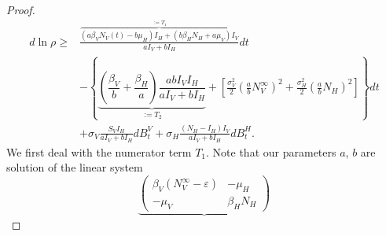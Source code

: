 \begin{proof}
\begin{equation}
        \begin{aligned}
            d \ln \rho
                \geq &
                \frac{
                    \overbrace{
                        \left(
                            a \beta_V N_V(t) - b \mu_H
                        \right) I_H
                        +
                        \left(
                            b \beta_H N_H + a \mu_V
                        \right) I_V
                    } ^ {:=T_1}
                }{a I_V + bI_H}
                dt
                \\
                &-
                \left \{
                    \underbrace{
                        \left(
                            \dfrac{\beta_V}{b}
                            +
                            \dfrac{\beta_H}{a}
                        \right)
                        \dfrac{
                            a b I_V I_H
                        }{
                            a I_V + b I_H
                        }
                    }_{:=T_2}
                    +
                    \left[
                        \frac{\sigma_V ^ 2}{2}
                        \left(
                            \frac{a}{b} N_V ^ \infty
                        \right) ^2
                        +
                        \frac{\sigma_H ^ 2}{2}
                        \left(
                            \frac{a}{b}
                            N_H
                        \right) ^ 2
                    \right]
                \right\}
                dt
                \\
                & +
                \sigma_V 
                \frac{S_V I_H}{a I_V + b I_H}
                d B_t ^ V
                +
                \sigma_H 
                \frac{(N_H - I_H) I_V}{a I_V + b I_H}
                d B_t ^ H .
        \end{aligned}
    \end{equation}
    We first deal with the numerator term $T_1$. Note that our parameters $a$, 
    $b$ are solution of the linear system
    \begin{equation*}
        \underbrace{
            \begin{pmatrix}
                \beta_V \left(N_V ^ {\infty} -\varepsilon\right)
                    & - \mu_H 
                \\
                - \mu_V
                    & \beta_H N_H
            \end{pmatrix}
}
\end{equation*}
\end{proof}
